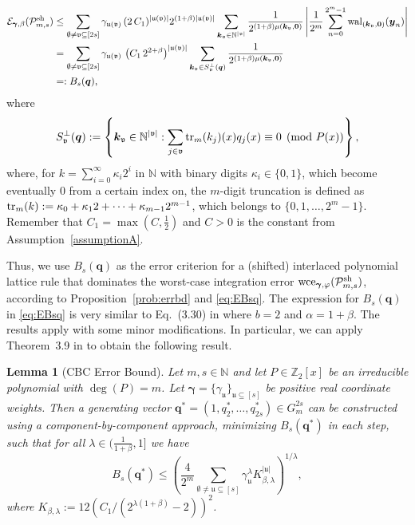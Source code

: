 \documentclass[namedate,webpdf,imanum]{ima-authoring-arxiv}%
\theoremstyle{thmstyletwo}%
\newtheorem{lemma}{Lemma}
\numberwithin{equation}{section}
\newcommand{\wal}{{\rm wal}}
\newcommand{\bsy}{\boldsymbol{y}}
\newcommand{\bsk}{\boldsymbol{k}}
\newcommand{\bsq}{\boldsymbol{q}}
\newcommand{\bsgamma}{\boldsymbol{\gamma}}
\newcommand{\bszero}{\boldsymbol{0}}
\newcommand{\uu}{\mathfrak{u}}
\newcommand{\vv}{\mathfrak{v}}
\newcommand{\cP}{\mathcal{P}}
\begin{document}
\begin{align}\label{eq:EBsq}
\mathcal{E}_{\bsgamma,\beta}(\cP_{m,s}^{{\rm sh}})
& \le  \sum_{\emptyset \not= \vv \subseteq [2s]} \gamma_{\uu(\vv)} \, (2 \, C_1)^{|\uu(\vv)|}  2^{(1+\beta) |\uu(\vv)|} \sum_{\bsk_\vv \in \mathbb{N}^{|\vv|}} \frac{1}{2^{(1+\beta) \mu(\bsk_{\vv},\bszero)}}  \left|\frac{1}{2^m} \sum_{n=0}^{2^m-1} \wal_{(\bsk_\vv,\bszero)}(\bsy_n)\right| \nonumber\\  
& = \sum_{\emptyset \not= \vv \subseteq [2s]} \gamma_{\uu(\vv)} \, \left(C_1 \, 2^{2+\beta}\right)^{|\uu(\vv)|} \sum_{\bsk_\vv \in S^\perp_{\vv}(\bsq)} \frac{1}{2^{(1+\beta) \mu(\bsk_{\vv}, \bszero)}}\\
& = : B_s(\bsq),\nonumber
\end{align}
where
\begin{equation*}
S^\perp_{\vv}(\bsq) := \left\{ \bsk_\vv \in \mathbb{N}^{|\vv|}: \sum_{j \in \vv} {\rm tr}_m(k_j)(x) q_j(x) \equiv 0 \pmod{P(x)}\right\},
\end{equation*}
where, for $k=\sum_{i=0}^{\infty} \kappa_i 2^i$ in $\mathbb{N}$ with binary digits $\kappa_i \in \{0,1\}$, which become eventually 0 from a certain index on, the $m$-digit truncation is defined as ${\rm tr}_m(k):=\kappa_0 +\kappa_1 2+\cdots+\kappa_{m-1} 2^{m-1}$, which belongs to $\{0,1,\ldots,2^m-1\}$. Remember that $C_1 = \max(C, \tfrac12)$ and $C > 0$ is the constant from Assumption~\ref{assumptionA}.

Thus, we use $B_s(\bsq)$ as the error criterion for a (shifted) interlaced polynomial lattice rule that dominates the worst-case integration error ${\rm wce}_{\bsgamma,\varphi}(\cP_{m,s}^{{\rm sh}})$, according to Proposition~\ref{prob:errbd} and \eqref{eq:EBsq}. The expression for $B_s(\bsq)$ in \eqref{eq:EBsq} is very similar to Eq.~(3.30) in \cite{DKLNS14} where $b = 2$ and $\alpha = 1+\beta$. The results apply with some minor modifications. In particular, we can apply Theorem~3.9 in \cite{DKLNS14} to obtain the following result.


\begin{lemma}[CBC Error Bound]\label{CBCerrorbound}
Let $m, s \in \mathbb{N}$ and let $P \in \mathbb{Z}_2[x]$ be an irreducible polynomial with $\deg(P) = m $. Let $\bsgamma=\{\gamma_{\uu}\}_{\uu \subseteq [s]}$ be positive real coordinate weights. Then a generating vector $\bsq^* = (1, q_2^*, \ldots, q_{2s}^*) \in G_m^{2s} $ can be constructed using a component-by-component approach, minimizing $B_s(\bsq^\ast)$ in each step, such that for all $ \lambda \in (\frac{1}{1+\beta}, 1]$ we have
\begin{equation*}%
B_s(\bsq^\ast) \leq \left( \frac{4}{2^m} \sum_{\emptyset \not= \uu \subseteq [s]} \gamma_{\uu}^\lambda K_{\beta,\lambda}^{|\uu|} \right)^{1/\lambda},
\end{equation*}
where $K_{\beta,\lambda}:=12 (C_1 / (2^{\lambda (1+\beta)} - 2))^2$.
\end{lemma}
\end{document}
